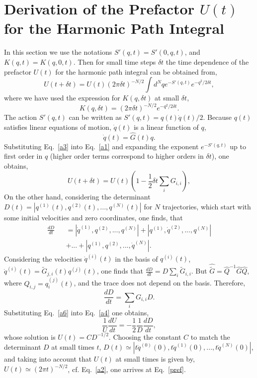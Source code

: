 \documentclass[journal=jpcafh,manuscript=article]{achemso}
\begin{document}
\section{Derivation of the Prefactor $U(t)$ for the Harmonic Path Integral}
In this section we use the notations $S'(q, t)=S'(0,q,t)$, and
$K(q, t)=K(q,0,t)$.  Then for small time steps $\delta t$ the time
dependence of the prefactor $U(t)$ for the harmonic path integral can
be obtained from,
\begin{equation}
  \label{a1}
  U(t + \delta t) = U(t)(2\pi\delta t)^{-N/2}\int d^Nq
  e^{-S'(q,t)}e^{-q^2/2\delta t},
\end{equation}
where we have used the expression for $K(q, \delta t)$ at small
$\delta t$,
\begin{equation}
  \label{a2}
  K(q,\delta t)=(2\pi\delta t)^{-N/2}e^{-q^2/2\delta t}.
\end{equation}
The action $S'(q,t)$ can be written as
$S'(q,t)=q(t)\dot{q}(t)/2$. Because $q(t)$ satisfies linear
equations of motion, $\dot{q}(t)$ is a linear function of $q$,
\begin{equation}
  \label{a3}
  \dot{q}(t)=\hat{G}(t)q.
\end{equation}
Substituting Eq.~\ref{a3} into Eq.~\ref{a1} and expanding the exponent
$e^{-S'(q,t)}$ up to first order in $q$ (higher order terms
correspond to
higher orders in $\delta t$), one obtains,
\begin{equation}
  \label{a4}
  U(t + \delta t) = U(t)(1 -\frac{1}{2}\delta t\sum_iG_{i,i}),
\end{equation}
On the other hand, considering the determinant 
$D(t)=|q^{(1)}(t),q^{(2)}(t),...,q^{(N)}(t)|$  for $N$ trajectories, which start
with some initial velocities and zero coordinates, one finds, that
\begin{eqnarray}
  \label{a5}
  \frac{dD}{dt}&&=|\dot{q}^{(1)},q^{(2)},...,q^{(N)}|+|q^{(1)},\dot{q}^{(2)},...,q^{(N)}|
  \\
  \nonumber
  &&+...+|q^{(1)},q^{(2)},...,\dot{q}^{(N)}|.
\end{eqnarray}
Considering the velocities $\dot{q}^{(i)}(t)$ in the basis of $q^{(i)}(t)$,
$\dot{q}^{(i)}(t)=\tilde{G}_{j,i}(t)q^{(j)}(t)$, one finds that
$\frac{dD}{dt}=D\sum_i\tilde{G}_{i,i}$.
But $\hat{\tilde{G}}=\hat{Q}^{-1}\hat{G}\hat{Q}$, where
$Q_{i,j}=q_i^{(j)}(t)$, and the trace does not depend on the
basis. Therefore,
\begin{equation}
  \label{a6}
  \frac{dD}{dt} = \sum_iG_{i,i}D.
\end{equation}
Substituting Eq.~\ref{a6} into Eq.~\ref{a4} one obtains,
\begin{equation}
  \label{a7}
  \frac{1}{U}\frac{dU}{dt}= -\frac{1}{2}\frac{1}{D}\frac{dD}{dt},
\end{equation}
whose solution is $U(t)=CD^{-1/2}$. Choosing the constant $C$ to match
the determinant $D$ at small times $t$,
$D(t)\simeq|t\dot{q}^{(0)}(0),t\dot{q}^{(1)}(0),...,t\dot{q}^{(N)}(0)|$, and taking into
account that $U(t)$ at small times is given by,
$U(t)\simeq(2\pi t)^{-N/2}$, cf. Eq.~\ref{a2}, one arrives at
Eq.~\ref{pref}.
\end{document}
